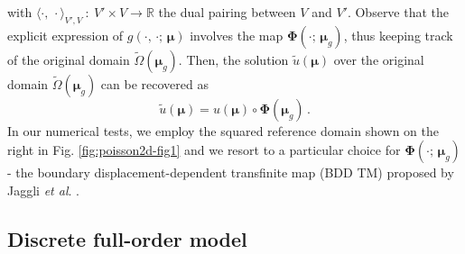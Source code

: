 \documentclass[longtitle]{elsarticle}
\numberwithin{equation}{section}
\theoremstyle{theorem}
\theoremstyle{definition}
\theoremstyle{remark}
\theoremstyle{proposition}
\numberwithin{figure}{section}
\newcommand{\wt}[1]{\widetilde{#1}}
\newcommand{\bg}[1]{\boldsymbol{#1}}
\begin{document}
		with $\langle \cdot, \, \cdot \rangle_{V',V} ~ : ~ V' \times V \rightarrow \mathbb{R}$ the dual pairing between $V$ and $V'$. Observe that the explicit expression of $g(\cdot, \, \cdot; \, \bg{\mu})$ involves the map $\bg{\Phi}(\cdot; \, \bg{\mu}_g)$, thus keeping track of the original domain $\wt{\Omega}(\bg{\mu}_g)$. Then, the solution $\wt{u}(\bg{\mu})$ over the original domain $\wt{\Omega}(\bg{\mu}_g)$ can be recovered as
		\begin{equation*}
			\wt{u}(\bg{\mu}) = u(\bg{\mu}) \circ \bg{\Phi}(\bg{\mu}_g) \, .
		\end{equation*}
		In our numerical tests, we employ the squared reference domain shown on the right in Fig. \ref{fig:poisson2d-fig1} and we resort to a particular choice for $\bg{\Phi}(\cdot; \, \bg{\mu}_g)$ - the boundary displacement-dependent transfinite map (BDD TM) proposed by Jaggli \emph{et al}. \cite{JIR14}.
		
		
	
	\subsection{Discrete full-order model}
	\label{section:Discrete full-order model}
	
\end{document}
